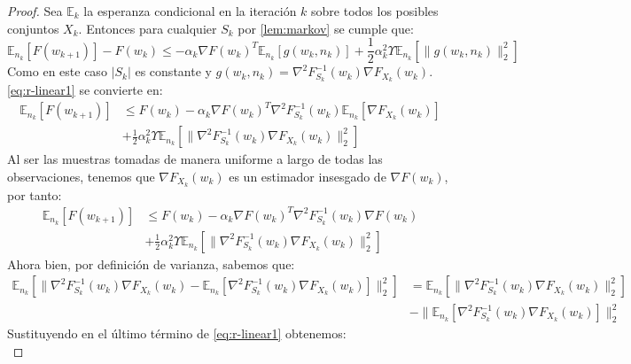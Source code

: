 \documentclass{book}
\theoremstyle{plain}
\theoremstyle{definition}
\theoremstyle{remark}
\begin{document}
\begin{proof}
Sea $\mathbb{E}_k$ la esperanza condicional en la iteración $k$ sobre todos los posibles conjuntos $X_k$. Entonces para cualquier $S_k$ por \ref{lem:markov} se cumple que: 
\begin{equation}\label{eq:r-linear1}
        \mathbb{E}_{n_k}[F(w_{k+1})] - F(w_{k}) \leq -\alpha_k\nabla F(w_{k})^T\mathbb{E}_{n_k}[g(w_{k}, n_{k})]+\frac{1}{2}\alpha^2_k\Upsilon\mathbb{E}_{n_k}[\|g(w_{k}, n_{k})\|_2^2]
\end{equation}
Como en este caso $|S_k|$ es constante y $g(w_k,n_k)=\nabla^2F_{S_k}^{-1}(w_k)\nabla F_{X_k}(w_k)$. \ref{eq:r-linear1} se convierte en: 
\begin{equation}
    \begin{split}
        \mathbb{E}_{n_k}[F(w_{k+1})] & \leq F(w_{k}) -\alpha_k\nabla F(w_{k})^T\nabla^2F_{S_k}^{-1}(w_k)\mathbb{E}_{n_k}[\nabla F_{X_k}(w_k)]\\ & +\frac{1}{2}\alpha^2_k\Upsilon\mathbb{E}_{n_k}[\|\nabla^2F_{S_k}^{-1}(w_k)\nabla F_{X_k}(w_k)\|_2^2]
    \end{split}
\end{equation}
Al ser las muestras tomadas de manera uniforme a largo de todas las observaciones, tenemos que $\nabla F_{X_k}(w_k)$ es un estimador insesgado de $\nabla F(w_k)$, por tanto:
\begin{equation}\label{eq:r-linear2}
\begin{split}
        \mathbb{E}_{n_k}[F(w_{k+1})] & \leq F(w_{k}) -\alpha_k\nabla F(w_{k})^T\nabla^2F_{S_k}^{-1}(w_k)\nabla F(w_k)\\ & +\frac{1}{2}\alpha^2_k\Upsilon\mathbb{E}_{n_k}[\|\nabla^2F_{S_k}^{-1}(w_k)\nabla F_{X_k}(w_k)\|_2^2]   
\end{split}
\end{equation}
Ahora bien, por definición de varianza, sabemos que: 
\begin{equation*}
\begin{split}
    \mathbb{E}_{n_k}[\|\nabla^2F_{S_k}^{-1}(w_k)\nabla F_{X_k}(w_k) - \mathbb{E}_{n_k}[\nabla^2F_{S_k}^{-1}(w_k)\nabla F_{X_k}(w_k)]\|_2^2] & = \mathbb{E}_{n_k}[\|\nabla^2F_{S_k}^{-1}(w_k)\nabla F_{X_k}(w_k)\|_2^2] \\ & - \|\mathbb{E}_{n_k}[\nabla^2F_{S_k}^{-1}(w_k)\nabla F_{X_k}(w_k)]\|_2^2 
    \end{split}
\end{equation*}
Sustituyendo en el último término de \ref{eq:r-linear1} obtenemos:
\begin{equation}\label{eq:r-linear3}

\end{equation}
\end{proof}
\end{document}
